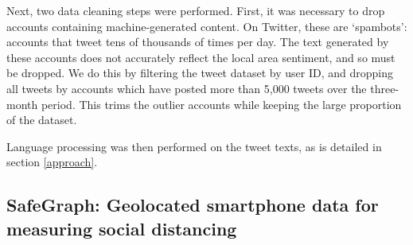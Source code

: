 \documentclass{article}
\begin{document}
Next, two data cleaning steps were performed. First, it was necessary to drop accounts containing machine-generated content. On Twitter, these are `spambots': accounts that tweet tens of thousands of times per day. The text generated by these accounts does not accurately reflect the local area sentiment, and so must be dropped. We do this by filtering the tweet dataset by user ID, and dropping all tweets by accounts which have posted more than 5,000 tweets over the three-month period. This trims the outlier accounts while keeping the large proportion of the dataset.


Language processing was then performed on the tweet texts, as is detailed in section \ref{approach}. 

\subsection{SafeGraph: Geolocated smartphone data for measuring social distancing}
\end{document}

